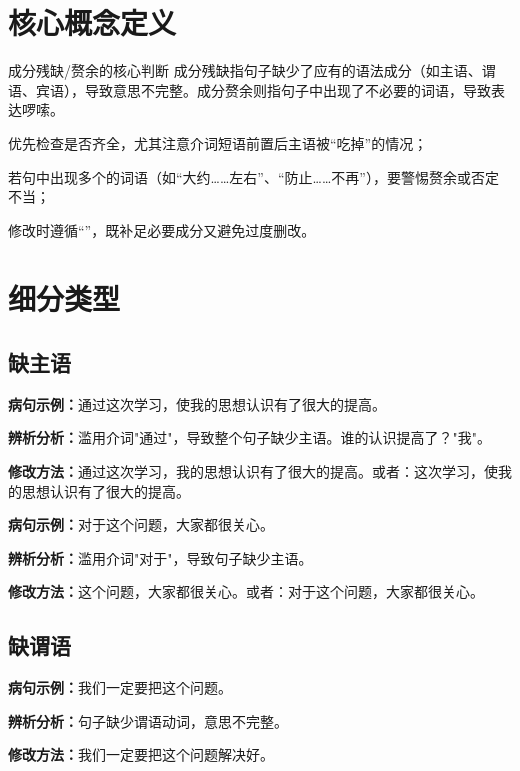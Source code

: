 \documentclass[a4paper,12pt]{ctexrep}
\newcommand{\exampleicon}{\textcolor{highlight}{\faExclamationTriangle}}
\newcommand{\analysisicon}{\textcolor{accent}{\faSearch}}
\newcommand{\revisionicon}{\textcolor{secondary}{\faCheckCircle}}
\begin{document}
\section{核心概念定义}
\begin{conceptbox}{成分残缺/赘余的核心判断}
成分残缺指句子缺少了应有的语法成分（如主语、谓语、宾语），导致意思不完整。成分赘余则指句子中出现了不必要的词语，导致表达啰嗦。
\begin{focuspoints}
  \item 优先检查是否齐全，尤其注意介词短语前置后主语被“吃掉”的情况；
  \item 若句中出现多个的词语（如“大约……左右”、“防止……不再”），要警惕赘余或否定不当；
  \item 修改时遵循“”，既补足必要成分又避免过度删改。
\end{focuspoints}
\end{conceptbox}

\section{细分类型}
\subsection{缺主语}
\exampleicon \textbf{病句示例：}通过这次学习，使我的思想认识有了很大的提高。

\analysisicon \textbf{辨析分析：}滥用介词"通过"，导致整个句子缺少主语。谁的认识提高了？"我"。

\revisionicon \textbf{修改方法：}通过这次学习，我的思想认识有了很大的提高。或者：这次学习，使我的思想认识有了很大的提高。

\exampleicon \textbf{病句示例：}对于这个问题，大家都很关心。

\analysisicon \textbf{辨析分析：}滥用介词"对于"，导致句子缺少主语。

\revisionicon \textbf{修改方法：}这个问题，大家都很关心。或者：对于这个问题，大家都很关心。

\subsection{缺谓语}
\exampleicon \textbf{病句示例：}我们一定要把这个问题。

\analysisicon \textbf{辨析分析：}句子缺少谓语动词，意思不完整。

\revisionicon \textbf{修改方法：}我们一定要把这个问题解决好。
\end{document}
